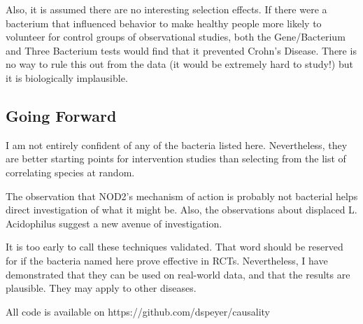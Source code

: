 \documentclass[a4paper]{article}
\begin{document}
Also, it is assumed there are no interesting selection effects.  If
there were a bacterium that influenced behavior to make healthy people
more likely to volunteer for control groups of observational studies,
both the Gene/Bacterium and Three Bacterium tests would find that it
prevented Crohn's Disease.  There is no way to rule this out from the
data (it would be extremely hard to study!) but it is biologically
implausible.

\subsection{Going Forward}

I am not entirely confident of any of the bacteria listed here.
Nevertheless, they are better starting points for intervention studies
than selecting from the list of correlating species at random.

The observation that NOD2's mechanism of action is probably not
bacterial helps direct investigation of what it might be.  Also, the
observations about displaced L. Acidophilus suggest a new avenue of
investigation.

It is too early to call these techniques validated.  That word should
be reserved for if the bacteria named here prove effective in RCTs.
Nevertheless, I have demonstrated that they can be used on real-world
data, and that the results are plausible.  They may apply to other
diseases.

All code is available on https://github.com/dspeyer/causality
\end{document}
